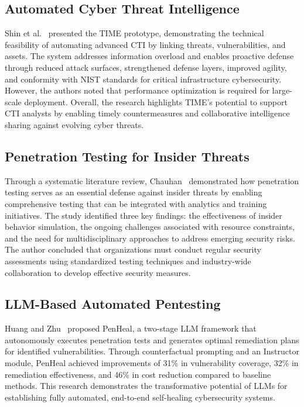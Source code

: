 \documentclass[12pt, a4paper]{article}
\begin{document}
\subsection{Automated Cyber Threat Intelligence}

Shin et al.~\cite{ref1} presented the TIME prototype, demonstrating the technical feasibility of automating advanced CTI by linking threats, vulnerabilities, and assets. The system addresses information overload and enables proactive defense through reduced attack surfaces, strengthened defense layers, improved agility, and conformity with NIST standards for critical infrastructure cybersecurity. However, the authors noted that performance optimization is required for large-scale deployment. Overall, the research highlights TIME's potential to support CTI analysts by enabling timely countermeasures and collaborative intelligence sharing against evolving cyber threats.

\subsection{Penetration Testing for Insider Threats}

Through a systematic literature review, Chauhan~\cite{ref2} demonstrated how penetration testing serves as an essential defense against insider threats by enabling comprehensive testing that can be integrated with analytics and training initiatives. The study identified three key findings: the effectiveness of insider behavior simulation, the ongoing challenges associated with resource constraints, and the need for multidisciplinary approaches to address emerging security risks. The author concluded that organizations must conduct regular security assessments using standardized testing techniques and industry-wide collaboration to develop effective security measures.

\subsection{LLM-Based Automated Pentesting}

Huang and Zhu~\cite{ref3} proposed PenHeal, a two-stage LLM framework that autonomously executes penetration tests and generates optimal remediation plans for identified vulnerabilities. Through counterfactual prompting and an Instructor module, PenHeal achieved improvements of 31\% in vulnerability coverage, 32\% in remediation effectiveness, and 46\% in cost reduction compared to baseline methods. This research demonstrates the transformative potential of LLMs for establishing fully automated, end-to-end self-healing cybersecurity systems.
\end{document}
